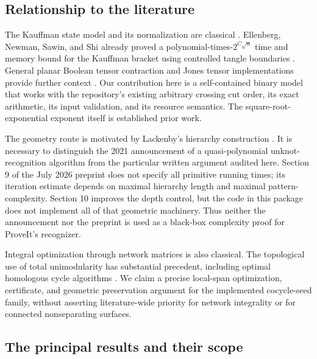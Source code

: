 \subsection{Relationship to the literature}

The Kauffman state model and its normalization are classical
\cite{kauffman1987}. Ellenberg, Newman, Sawin, and Shi already proved a
polynomial-times-$2^{C\sqrt n}$ time and memory bound for the Kauffman bracket
using controlled tangle boundaries \cite{ellenberg2013}. General planar
Boolean tensor contraction and Jones tensor implementations provide further
context \cite{liuying2023,meichanetzidis2019,laakkonen2026}. Our contribution
here is a self-contained binary model that works with the repository's
existing arbitrary crossing cut order, its exact arithmetic, its input
validation, and its resource semantics. The square-root-exponential exponent
itself is established prior work.

The geometry route is motivated by Lackenby's hierarchy construction
\cite{lackenby2026}. It is necessary to distinguish the 2021 announcement of
a quasi-polynomial unknot-recognition algorithm \cite{oxford2021} from the
particular written argument audited here. Section 9 of the July 2026 preprint
does not specify all primitive running times; its iteration estimate depends
on maximal hierarchy length and maximal pattern-complexity. Section 10
improves the depth control, but the code in this package does not implement
all of that geometric machinery. Thus neither the announcement nor the
preprint is used as a black-box complexity proof for ProveIt's recognizer.

Integral optimization through network matrices is also classical. The
topological use of total unimodularity has substantial precedent, including
optimal homologous cycle algorithms \cite{dey2011}. We claim a precise
local-span optimization, certificate, and geometric preservation argument
for the implemented cocycle-seed family, without asserting literature-wide
priority for network integrality or for connected nonseparating surfaces.



\subsection{The principal results and their scope}


